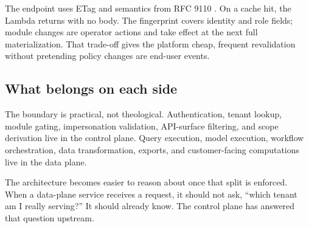 The endpoint uses ETag and  semantics from RFC 9110 \cite{rfc9110}. On a cache hit, the Lambda returns  with no body. The fingerprint covers identity and role fields; module changes are operator actions and take effect at the next full materialization. That trade-off gives the platform cheap, frequent revalidation without pretending policy changes are end-user events.

\subsection{What belongs on each side}

The boundary is practical, not theological. Authentication, tenant lookup, module gating, impersonation validation, API-surface filtering, and scope derivation live in the control plane. Query execution, model execution, workflow orchestration, data transformation, exports, and customer-facing computations live in the data plane.

The architecture becomes easier to reason about once that split is enforced. When a data-plane service receives a request, it should not ask, ``which tenant am I really serving?'' It should already know. The control plane has answered that question upstream.
